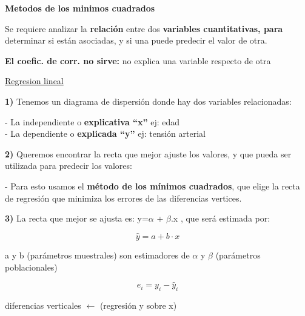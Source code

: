 \documentclass[12pt,a4paper]{article}
\begin{document}
\shorthandoff{<>}

{\fontsize{18}{22}\selectfont\bfseries Metodos de los minimos cuadrados\par}

Se requiere analizar la \textbf{relación} entre dos \textbf{variables cuantitativas, para} determinar si están asociadas, y si una puede predecir el valor de otra.

\textbf{El coefic. de corr. no sirve:} no explica una variable respecto de otra

\uline{Regresion lineal}

\textbf{1)} Tenemos un diagrama de dispersión donde hay dos variables relacionadas:

\hspace{18pt}\begin{minipage}{0.93\linewidth}
- La independiente o \textbf{explicativa ``x''} \quad ej: edad \\
- La dependiente o \textbf{explicada ``y''} \qquad ej: tensión arterial
\end{minipage}

\textbf{2)} Queremos encontrar la recta que mejor ajuste los valores, y que pueda ser utilizada para predecir los valores:

\hspace{18pt}\begin{minipage}{0.93\linewidth}
- Para esto usamos el \textbf{método de los mínimos cuadrados}, que elige la recta de regresión que minimiza los errores de las diferencias vertices.
\end{minipage}

\textbf{3)} La recta que mejor se ajusta es: y=$\alpha$ + $\beta$.x , que será estimada por:

\begin{minipage}[t]{0.30\linewidth}
\vspace{2pt}
\[
\widehat{y} = a + b\cdot x
\]
\end{minipage}\hfill
\begin{minipage}[t]{0.68\linewidth}
\vspace{6pt}
a y b (parámetros muestrales) son estimadores de $\alpha$ y $\beta$ (parámetros poblacionales)
\end{minipage}

\begin{minipage}[t]{0.30\linewidth}
\vspace{2pt}
\[
e_i = y_i - \widehat{y}_i
\]
\end{minipage}\hfill
\begin{minipage}[t]{0.68\linewidth}
\vspace{6pt}
diferencias verticales $\longleftarrow$ (regresión y sobre x)
\end{minipage}
\end{document}
